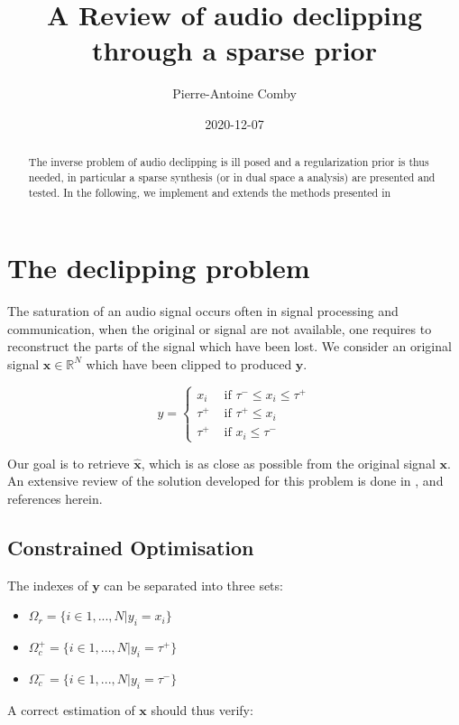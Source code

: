 \documentclass[twocolumn]{scrartcl}
\author{Pierre-Antoine Comby}
\date{2020-12-07}
\title{A Review of audio declipping through a sparse prior}
\renewcommand{\vec}[1]{\boldsymbol{#1}}
\begin{document}
\maketitle
\begin{abstract}
  The inverse problem of audio declipping is ill posed and a regularization prior is thus needed, in particular a sparse synthesis (or in dual space a analysis) are presented and tested. In the following, we implement and extends the methods presented in \cite{kitic_sparsity_2015-1}
\end{abstract}

\section{The declipping problem}

The saturation of an audio signal occurs often in signal processing and communication, when the original or signal are not available, one requires to reconstruct the parts of the signal which have been lost.
We  consider an original signal \(\vec{x} \in \mathbb{R}^{N}\) which have been clipped to produced \(\vec{y}\).

\[y =
  \begin{cases}
    x_{i} & \text{ if }  \tau^{-} \le x_{i} \le \tau^{+} \\
    \tau^{+} & \text{ if }  \tau^{+} \le x_{i} \\
    \tau^{+} & \text{ if }  x_{i} \le \tau^{-}
  \end{cases}\]

Our goal is to retrieve \(\hat{\vec{x}}\), which is as close as possible from the original signal  \(\vec{x}\). An extensive review of the solution developed for this problem is done in \cite{noauthor_survey_nodate}, and references herein.

\subsection{Constrained Optimisation}
The indexes of \(\vec{y}\) can be separated into three sets:
\begin{itemize}
  \item \(\Omega_r = \{i \in 1,...,N | y_i = x_i \}\)
  \item \(\Omega_c^+ = \{i \in  1,...,N | y_i =  \tau^{+} \}\)
  \item \(\Omega_c^- = \{i \in 1, ..., N| y_i = \tau^{-} \}\)
\end{itemize}

A correct estimation of \(\vec{x}\)  should thus verify:
\end{document}
